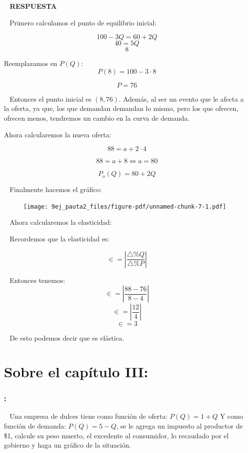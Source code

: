 \documentclass[
  letterpaper,
  DIV=11,
  numbers=noendperiod]{scrreport}
\begin{document}
~ \textbf{RESPUESTA}

~ Primero calculamos el punto de equilibrio inicial:

\[
100-3Q=60+2Q
\] \[
40=5Q
\] \[
8
\]

Reemplazamos en \(P(Q)\): \[
P(8)=100-3\cdot 8
\]

\[
P = 76
\]

~ Entonces el punto inicial es \((8,76)\). Además, al ser un evento que
le afecta a la oferta, ya que, los que demandan demandan lo mismo, pero
los que ofrecen, ofrecen menos, tendremos un cambio en la curva de
demanda.

Ahora calcularemos la nueva oferta:

\[
88=a+2\cdot 4
\]

\[
88=a+8 \Leftrightarrow a=80
\]

\[
P_o(Q)=80+2Q
\]

~ Finalmente hacemos el gráfico:

\begin{figure}

{\centering \texttt{[image: 9ej\_pauta2\_files/figure-pdf/unnamed-chunk-7-1.pdf]}

}

\end{figure}

~ Ahora calcularemos la elasticidad:

~ Recordemos que la elasticidad es:

\[
\in =\left|\dfrac{\triangle\%Q}{\triangle\%P} \right|
\]

~ Entonces tenemos: \[
\in=\left|\frac{88-76}{8-4} \right|
\] \[
\in=\left|\frac{12}{4} \right|
\] \[
\in=3
\]

~ De esto podemos decir que es elástica.


\hypertarget{sobre-el-capuxedtulo-iii-1}{%
\chapter{Sobre el capítulo III:}\label{sobre-el-capuxedtulo-iii-1}}

\hypertarget{section-29}{%
\subsection{:}\label{section-29}}

~ Una empresa de dulces tiene como función de oferta: \(P(Q)=1+Q\) Y
como función de demanda: \(P(Q)=5-Q\), se le agrega un impuesto al
productor de \$1, calcule su peso muerto, el excedente al consumidor, lo
recaudado por el gobierno y haga un gráfico de la situación.
\end{document}
